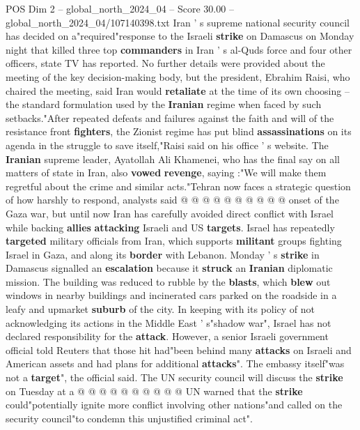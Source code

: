 \begin{textsample}{POS Dim 2 – global\_north\_2024\_04 – Score 30.00 – global\_north\_2024\_04/107140398.txt}  \label{ex:f2_pos_162}
Iran ' s supreme national security council has decided on a"required"response to the Israeli \textbf{strike} on Damascus on Monday night that killed three top \textbf{commanders} in Iran ' s al-Quds force and four other officers, state TV has reported.
No further details were provided about the meeting of the key decision-making body, but the president, Ebrahim Raisi, who chaired the meeting, said Iran would \textbf{retaliate} at the time of its own choosing -- the standard formulation used by the \textbf{Iranian} regime when faced by such setbacks."After repeated defeats and failures against the faith and will of the resistance front \textbf{fighters}, the Zionist regime has put blind \textbf{assassinations} on its agenda in the struggle to save itself,"Raisi said on his office ' s website.
The \textbf{Iranian} supreme leader, Ayatollah Ali Khamenei, who has the final say on all matters of state in Iran, also \textbf{vowed} \textbf{revenge}, saying :"We will make them regretful about the crime and similar acts."Tehran now faces a strategic question of how harshly to respond, analysts said @ @ @ @ @ @ @ @ @ @ onset of the Gaza war, but until now Iran has carefully avoided direct conflict with Israel while backing \textbf{allies} \textbf{attacking} Israeli and US \textbf{targets}.
Israel has repeatedly \textbf{targeted} military officials from Iran, which supports \textbf{militant} groups fighting Israel in Gaza, and along its \textbf{border} with Lebanon.
Monday ' s \textbf{strike} in Damascus signalled an \textbf{escalation} because it \textbf{struck} an \textbf{Iranian} diplomatic mission.
The building was reduced to rubble by the \textbf{blasts}, which \textbf{blew} out windows in nearby buildings and incinerated cars parked on the roadside in a leafy and upmarket \textbf{suburb} of the city.
In keeping with its policy of not acknowledging its actions in the Middle East ' s"shadow war", Israel has not declared responsibility for the \textbf{attack}.
However, a senior Israeli government official told Reuters that those hit had"been behind many \textbf{attacks} on Israeli and American assets and had plans for additional \textbf{attacks}".
The embassy itself"was not a \textbf{target}", the official said.
The UN security council will discuss the \textbf{strike} on Tuesday at a @ @ @ @ @ @ @ @ @ @ UN warned that the \textbf{strike} could"potentially ignite more conflict involving other nations"and called on the security council"to condemn this unjustified criminal act".

\end{textsample}
